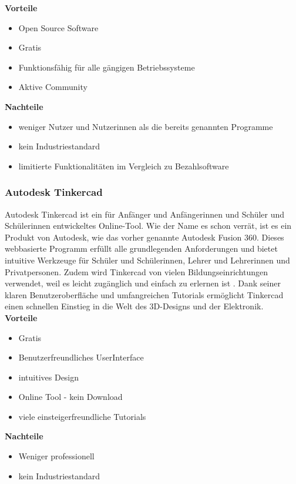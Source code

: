 \textbf{Vorteile}
\begin{itemize}
	\item Open Source Software
	\item Gratis
	\item Funktionsfähig für alle gängigen Betriebssysteme
	\item Aktive Community \parencite{FreeCADReviews}
\end{itemize}

\textbf{Nachteile}
\begin{itemize}
	\item weniger Nutzer und Nutzerinnen als die bereits genannten Programme
	\item kein Industriestandard
	\item limitierte Funktionalitäten im Vergleich zu Bezahlsoftware \parencite{FreeCADReviews}
\end{itemize}

\subsubsection{Autodesk Tinkercad}
Autodesk Tinkercad ist ein für Anfänger und Anfängerinnen und Schüler und Schülerinnen entwickeltes Online-Tool. Wie der Name es schon verrät, ist es ein Produkt von Autodesk, wie das vorher genannte Autodesk Fusion 360. Dieses webbasierte Programm erfüllt alle grundlegenden Anforderungen und bietet intuitive Werkzeuge für Schüler und Schülerinnen, Lehrer und Lehrerinnen und Privatpersonen. Zudem wird Tinkercad von vielen Bildungseinrichtungen verwendet, weil es leicht zugänglich und einfach zu erlernen ist \parencite{Tinkercad}. Dank seiner klaren Benutzeroberfläche und umfangreichen Tutorials ermöglicht Tinkercad einen schnellen Einstieg in die Welt des 3D-Designs und der Elektronik. \\


\textbf{Vorteile}
\begin{itemize}
	\item Gratis
	\item Benutzerfreundliches UserInterface
	\item intuitives Design
	\item Online Tool - kein Download 	
	\item viele einsteigerfreundliche Tutorials \parencite{TinkercadReviews}
\end{itemize}

\textbf{Nachteile}
\begin{itemize}
	\item Weniger professionell
	\item kein Industriestandard \parencite{TinkercadReviews}
\end{itemize}

